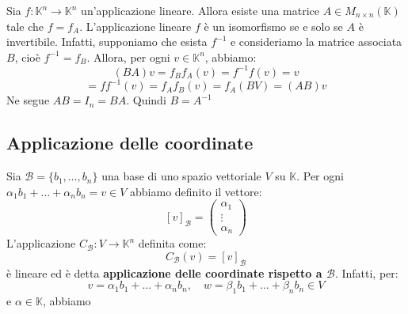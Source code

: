 \documentclass[a4paper]{article}
\theoremstyle{break}
\theoremstyle{break}
\theoremstyle{break}
\theoremstyle{break}
\begin{document}
\begin{example}
  Sia \( f: \mathbb{K}^n \to \mathbb{K}^n \) un'applicazione lineare. Allora esiste
  una matrice \( A \in M_{n \times n}(\mathbb{K}) \) tale che \( f = f_A \).
  L'applicazione lineare \( f \) è un isomorfismo se e solo se \( A \) è invertibile.
  Infatti, supponiamo che esista \( f^{-1} \) e consideriamo la matrice associata \( B \),
  cioè \( f^{-1} = f_B \). Allora, per ogni \( v \in \mathbb{K}^n \), abbiamo:
  \[
    (BA)v = f_B f_A(v) = f^{-1} f(v) = v
  \] 
  \[
   = f f^{-1}(v) = f_A f_B(v) =f_A (BV) = (AB)v
  \] 
  Ne segue \( AB = I_n = BA \). Quindi \( B = A^{-1} \) 
\end{example}

\subsection{Applicazione delle coordinate}
Sia \( \mathcal{B} = \{b_1, \ldots, b_n\}  \) una base di uno spazio vettoriale \( V \) 
su \( \mathbb{K} \). Per ogni \( \alpha_1 b_1 + \ldots + \alpha_n b_n = v \in V \) abbiamo
definito il vettore: \[ [v]_{\mathcal{B}} = \begin{pmatrix} 
  \alpha_1\\
  \vdots\\
  \alpha_n
\end{pmatrix} \]
L'applicazione \( C_{\mathcal{B}}: V \to \mathbb{K}^n \) definita come:
\[
  C_{\mathcal{B}}(v) = [v]_{\mathcal{B}}
\] 
è lineare ed è detta \textbf{applicazione delle coordinate rispetto a \( \mathcal{B} \)}.
Infatti, per:
\[
v = \alpha_1 b_1 + \ldots + \alpha_n b_n, \quad w = \beta_1 b_1 + \ldots + \beta_n b_n \in V
\] 
e \( \alpha \in \mathbb{K} \), abbiamo
\end{document}
